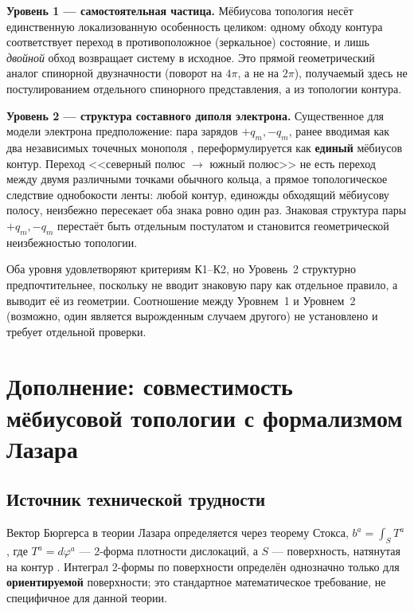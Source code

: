 \documentclass[12pt,a4paper]{article}
\begin{document}
\textbf{Уровень 1 --- самостоятельная частица.} Мёбиусова топология
несёт единственную локализованную особенность целиком: одному обходу
контура соответствует переход в противоположное (зеркальное) состояние,
и лишь \emph{двойной} обход возвращает систему в исходное. Это прямой
геометрический аналог спинорной двузначности (поворот на $4\pi$, а не
на $2\pi$), получаемый здесь не постулированием отдельного спинорного
представления, а из топологии контура.

\textbf{Уровень 2 --- структура составного диполя электрона.}
Существенное для модели электрона предположение: пара зарядов
$+q_m,-q_m$, ранее вводимая как два независимых точечных монополя
\cite{coax_current_rings}, переформулируется как \textbf{единый}
мёбиусов контур. Переход <<северный полюс $\to$ южный полюс>> не есть
переход между двумя различными точками обычного кольца, а прямое
топологическое следствие однобокости ленты: любой контур, единожды
обходящий мёбиусову полосу, неизбежно пересекает оба знака ровно один
раз. Знаковая структура пары $+q_m,-q_m$ перестаёт быть отдельным
постулатом и становится геометрической неизбежностью топологии.

Оба уровня удовлетворяют критериям К1--К2, но Уровень~2 структурно
предпочтительнее, поскольку не вводит знаковую пару как отдельное
правило, а выводит её из геометрии. Соотношение между Уровнем~1 и
Уровнем~2 (возможно, один является вырожденным случаем другого) не
установлено и требует отдельной проверки.


\section{Дополнение: совместимость мёбиусовой топологии с формализмом Лазара}
\label{sec:mobius-compatibility}

\subsection{Источник технической трудности}

Вектор Бюргерса в теории Лазара определяется через теорему Стокса,
$b^a=\int_S T^a$, где $T^a=d\varphi^a$ --- 2-форма плотности дислокаций,
а $S$ --- поверхность, натянутая на контур \cite{Lazar2010}. Интеграл
2-формы по поверхности определён однозначно только для
\textbf{ориентируемой} поверхности; это стандартное математическое
требование, не специфичное для данной теории.
\end{document}
